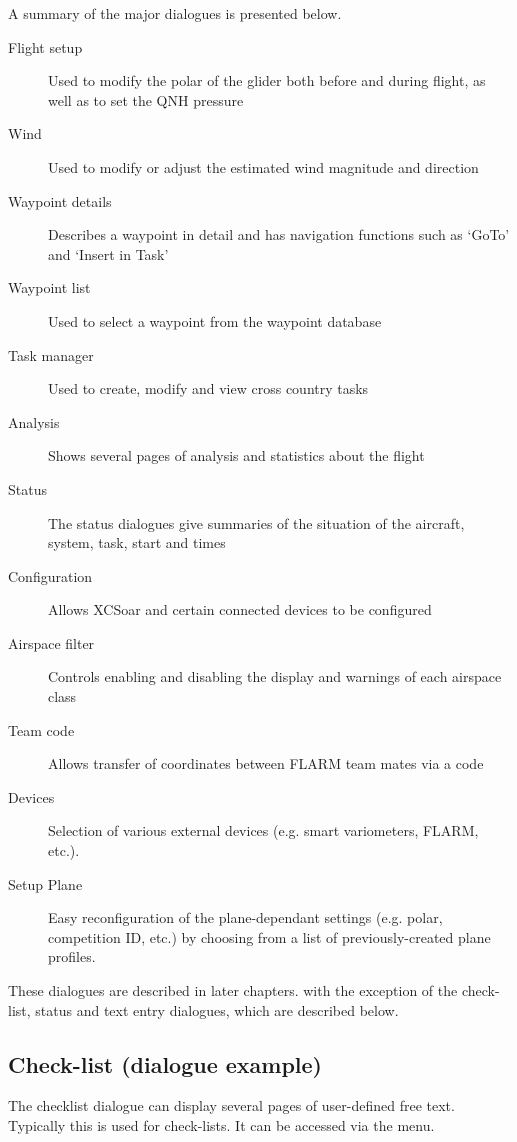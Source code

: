 A summary of the major dialogues is presented below.
\begin{description}
\item[Flight setup] Used to modify the polar of the glider both before and
during flight, as well as to set the QNH pressure
\item[Wind] Used to modify or adjust the estimated wind magnitude and direction
\item[Waypoint details] Describes a waypoint in detail and has navigation
functions such as `GoTo' and `Insert in Task'
\item[Waypoint list] Used to select a waypoint from the waypoint database
\item[Task manager] Used to create, modify and view cross country tasks
\item[Analysis] Shows several pages of analysis and statistics about the flight
\item[Status] The status dialogues give summaries of the situation of the 
aircraft, system, task, start and times
\item[Configuration] Allows XCSoar and certain connected devices to be
configured
\item[Airspace filter] Controls enabling and disabling the display and warnings
of each airspace class
\item[Team code] Allows transfer of coordinates between FLARM team mates via a 
  code
\item[Devices]  Selection of various external devices (e.g. smart variometers, 
  FLARM, etc.).
\item[Setup Plane]  Easy reconfiguration of the plane-dependant settings (e.g. 
  polar, competition ID, etc.) by choosing from a list of previously-created 
  plane profiles.
\end{description}

These dialogues are described in later chapters. with the exception of the
check-list, status and text entry dialogues, which are described below.


\subsection*{Check-list (dialogue example)}\label{sec:checklist}

The checklist dialogue can display several pages of user-defined free text.
Typically this is used for check-lists. It can be accessed via the menu.
\begin{quote}
\blink{}
\end{quote}

